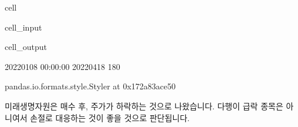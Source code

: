 \documentclass[letterpaper,10pt,english]{jupyterBook}
\begin{document}
\begin{sphinxuseclass}{cell}\begin{sphinxVerbatimInput}

\begin{sphinxuseclass}{cell_input}
\begin{sphinxVerbatim}[commandchars=\\\{\}]
  

    
         
\end{sphinxVerbatim}

\end{sphinxuseclass}\end{sphinxVerbatimInput}
\begin{sphinxVerbatimOutput}

\begin{sphinxuseclass}{cell_output}
\begin{sphinxVerbatim}[commandchars=\\\{\}]
2022\PYGZhy{}01\PYGZhy{}08 00:00:00 2022\PYGZhy{}04\PYGZhy{}18
180
\end{sphinxVerbatim}

\begin{sphinxVerbatim}[commandchars=\\\{\}]
\PYGZlt{}pandas.io.formats.style.Styler at 0x172a83ace50\PYGZgt{}
\end{sphinxVerbatim}

\end{sphinxuseclass}\end{sphinxVerbatimOutput}

\end{sphinxuseclass}
\sphinxAtStartPar
 미래생명자원은 매수 후, 주가가 하락하는 것으로 나왔습니다. 다행이 급락 종목은 아니여서 손절로 대응하는 것이 좋을 것으로 판단됩니다.
\end{document}
